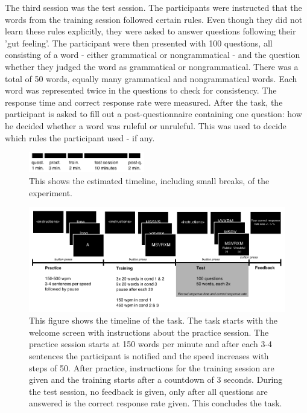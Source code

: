 \noindent The third session was the test session. The participants were instructed that the words from the training session followed certain rules. Even though they did not learn these rules explicitly, they were asked to answer questions following their 'gut feeling'. The participant were then presented with 100 questions, all consisting of a word - either grammatical or nongrammatical - and the question whether they judged the word as grammatical or nongrammatical. There was a total of 50 words, equally many grammatical and nongrammatical words. Each word was represented twice in the questions to check for consistency. The response time and correct response rate were measured. After the task, the participant is asked to fill out a post-questionnaire containing one question: how he decided whether a word was ruleful or unruleful. This was used to decide which rules the participant used - if any.

\begin{figure}[h]
	\centering
	\includegraphics[width=0.45\textwidth]{media/timeline-experiment}
	\caption{This shows the estimated timeline, including small breaks, of the experiment.}
	\label{fig:timeline}
\end{figure}


\begin{figure}[h]
	\centering
	\includegraphics[width=\textwidth]{media/tasktimeline}
	\caption{This figure shows the timeline of the task. The task starts with the welcome screen with instructions about the practice session. The practice session starts at 150 words per minute and after each 3-4 sentences the participant is notified and the speed increases with steps of 50. After practice, instructions for the training session are given and the training starts after a countdown of 3 seconds. During the test session, no feedback is given, only after all questions are answered is the correct response rate given. This concludes the task.}
	\label{fig:tasktimeline}
\end{figure}

